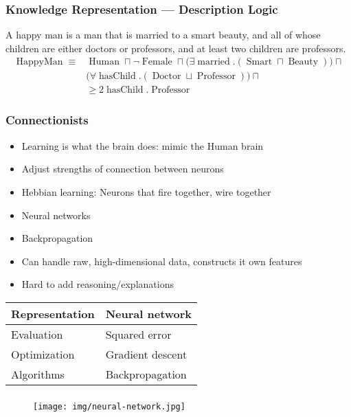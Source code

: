 \documentclass[UTF8,11pt,colorlinks,compress,openany]{beamer}%
\begin{document}
\begin{frame}\frametitle{Knowledge Representation --- Description Logic}
A happy man is a man that is married to a smart beauty, and all of whose children are either doctors or professors, and at least two children are professors.
\begin{align*}
\operatorname{HappyMan}\equiv&\operatorname{Human}\sqcap\neg \operatorname{Female}\sqcap\big(\exists \operatorname{married}.(\operatorname{Smart}\sqcap\operatorname{Beauty})\big)\sqcap\\
&\big(\forall \operatorname{hasChild}.(\operatorname{Doctor}\sqcup \operatorname{Professor})\big)\sqcap\\
&\geq\!\!2\!\operatorname{hasChild}.\operatorname{Professor}
\end{align*}
\end{frame}

\begin{frame}\frametitle{Connectionists}
\begin{itemize}
	\item Learning is what the brain does: mimic the Human brain
	\item Adjust strengths of connection between neurons
	\item Hebbian learning: Neurons that fire together, wire together
	\item Neural networks
	\item Backpropagation
	\item Can handle raw, high-dimensional data, constructs it own features
	\item Hard to add reasoning/explanations
\end{itemize}
\begin{table}
\abovetabulinesep=1mm
\belowtabulinesep=1mm
\begin{tabu}{l|l}
\hline
Representation &Neural network\\
\hline
Evaluation &Squared error\\
\hline
Optimization &Gradient descent\\
\hline
Algorithms &Backpropagation\\
\hline
\end{tabu}
\end{table}
\end{frame}

\begin{frame}\frametitle{}
\begin{figure}[H]
\texttt{[image: img/neural-network.jpg]}
\end{figure}
\end{frame}
\end{document}
